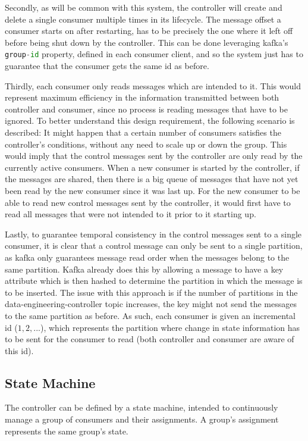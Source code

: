 Secondly, as will be common with this system, the controller will create and
delete a single consumer multiple times in its lifecycle. The message offset a
consumer starts on after restarting, has to be precisely the one where it left
off before being shut down by the controller. This can be done leveraging
kafka's \lstinline[language=Python]{group-id} property, defined in each consumer
client, and so the system just has to guarantee that the consumer gets the same
id as before.

Thirdly, each consumer only reads messages which are intended to it. This would
represent maximum efficiency in the information transmitted between both
controller and consumer, since no process is reading messages that have to be
ignored. To better understand this design requirement, the following scenario is
described: It might happen that a certain number of consumers satisfies the
controller's conditions, without any need to scale up or down the group. This
would imply that the control messages sent by the controller are only read by
the currently active consumers. When a new consumer is started by the
controller, if the messages are shared, then there is a big queue of messages
that have not yet been read by the new consumer since it was last up. For the
new consumer to be able to read new control messages sent by the controller, it
would first have to read all messages that were not intended to it prior to it
starting up.

Lastly, to guarantee temporal consistency in the control messages sent to a
single consumer, it is clear that a control message can only be sent to a single
partition, as kafka only guarantees message read order when the messages belong
to the same partition. Kafka already does this by allowing a message to have a
key attribute which is then hashed to determine the partition in which the
message is to be inserted. The issue with this approach is if the number of
partitions in the data-engineering-controller topic increases, the key might not
send the messages to the same partition as before. As such, each consumer is
given an incremental id ($1, 2, ...$), which represents the partition where
change in state information has to be sent for the consumer to read (both
controller and consumer are aware of this id).

\subsection{State Machine}

The controller can be defined by a state machine, intended to continuously
manage a group of consumers and their assignments. A group's assignment
represents the same group's state.

